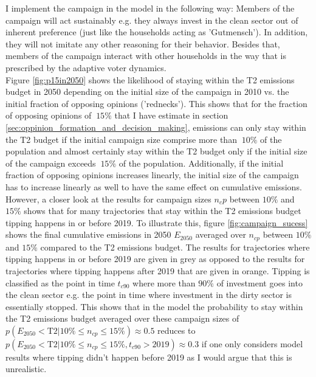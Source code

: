 I implement the campaign in the model in the following way: Members of the campaign will act sustainably e.g. they always invest in the clean sector out of inherent preference (just like the households acting as 'Gutmensch'). In addition, they will not imitate any other reasoning for their behavior. Besides that, members of the campaign interact with other households in the way that is prescribed by the adaptive voter dynamics.\\
Figure \ref{fig:p15in2050} shows the likelihood of staying within the T2 emissions budget in 2050 depending on the initial size of the campaign in 2010 vs. the initial fraction of opposing opinions ('rednecks'). This shows that for the fraction of opposing opinions of $~15\%$ that I have estimate in section \ref{sec:oppinion_formation_and_decision_making}, emissions can only stay within the T2 budget if the initial campaign size comprise more than $~10\%$ of the population and almost certainly stay within the T2 budget only if the initial size of the campaign exceeds $~15\%$ of the population. Additionally, if the initial fraction of opposing opinions increases linearly, the initial size of the campaign has to increase linearly as well to have the same effect on cumulative emissions.\\

However, a closer look at the results for campaign sizes $n_cp$ between $10\%$ and $15\%$ shows that for many trajectories that stay within the T2 emissions budget tipping happens in or before 2019. To illustrate this, figure \ref{fig:campaign_sucess} shows the final cumulative emissions in 2050 $E_{2050}$ averaged over $n_{cp}$ between $10\%$ and $15\%$ compared to the T2 emissions budget. The results for trajectories where tipping happens in or before 2019 are given in grey as opposed to the results for trajectories where tipping happens after 2019 that are given in orange. Tipping is classified as the point in time $t_{c90}$ where more than $90\%$ of investment goes into the clean sector e.g. the point in time where investment in the dirty sector is essentially stopped. This shows that in the model the probability to stay within the T2 emissions budget averaged over these campaign sizes of $p(E_{2050}<\mathrm{T2}|10\% \leq n_{cp} \leq 15\%) \approx 0.5$ reduces to $p(E_{2050}<\mathrm{T2}|10\% \leq n_{cp} \leq 15\%, t_{c90}>2019) \approx 0.3$ if one only considers model results where tipping didn't happen before 2019 as I would argue that this is unrealistic.


